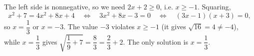 The left side is nonnegative, so we need $2x+2\ge0$, i.e. $x\ge-1$. Squaring,
\[x^2+7=4x^2+8x+4\quad\Longleftrightarrow\quad3x^2+8x-3=0\quad\Longleftrightarrow\quad(3x-1)(x+3)=0,\]
so $x=\dfrac{1}{3}$ or $x=-3$. The value $-3$ violates $x\ge-1$ (it gives $\sqrt{16}=4\ne-4$), while $x=\dfrac{1}{3}$ gives $\sqrt{\dfrac{1}{9}+7}=\dfrac{8}{3}=\dfrac{2}{3}+2$. The only solution is $\boxed{x=\dfrac{1}{3}}$.

